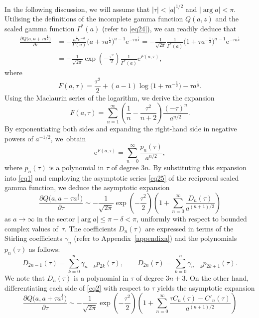 \documentclass[pdftex]{sigma}
\def\e{\mathrm{e}}
\numberwithin{equation}{section}
\begin{document}
In the following discussion, we will assume that $|\tau| < |a|^{1/2}$ and $|\arg a| < \pi$. Utilising the definitions of the incomplete gamma function $Q(a,z)$ and the scaled gamma function $\Gamma^\ast (a)$ (refer to \eqref{eq24}), we can readily deduce that
\begin{align}
\frac{\partial Q\big(a,a + \tau a^{\frac{1}{2}}\big)}{\partial \tau} & = - \frac{a^{\frac{1}{2}} \e^{ - a}}{\Gamma (a)}\big( a + \tau a^{\frac{1}{2}} \big)^{a - 1} \e^{ - \tau a^{\frac{1}{2}} } = - \frac{1}{\sqrt{2\pi }}\frac{1}{\Gamma^\ast (a)}\big( 1 + \tau a^{ - \frac{1}{2}}\big)^{a - 1} \e^{ - \tau a^{\frac{1}{2}} }\nonumber \\ & = - \frac{1}{\sqrt {2\pi }}\exp\left( - \frac{\tau^2}{2} \right)\frac{1}{\Gamma^\ast (a)}\e^{F(a,\tau )} ,\label{eq1}
\end{align}
where
\[
F(a,\tau ) = \frac{\tau ^2}{2} + (a - 1)\log \big(1 + \tau a^{-\frac{1}{2}}\big) - \tau a^{\frac{1}{2}} .
\]
Using the Maclaurin series of the logarithm, we derive the expansion
\[
F(a,\tau ) = \sum_{n = 1}^\infty \left( \frac{1}{n}-\frac{\tau^2}{n + 2}\right)\frac{( - \tau )^n}{a^{n/2}} .
\]
By exponentiating both sides and expanding the right-hand side in negative powers of $a^{-1/2}$, we~obtain
\[
\e^{F(a,\tau )} = \sum_{n = 0}^\infty \frac{p_n (\tau )}{a^{n/2} },
\]
where $p_n(\tau)$ is a polynomial in $\tau$ of degree $3n$. By substituting this expansion into \eqref{eq1} and employing the asymptotic series \eqref{eq25} of the reciprocal scaled gamma function, we deduce the asymptotic expansion
\[
\frac{\partial Q\big(a,a + \tau a^{\frac{1}{2}}\big)}{\partial \tau} \sim - \frac{1}{\sqrt{2\pi}}\exp \left(- \frac{\tau^2}{2}\right)\left( 1 + \sum_{n = 0}^\infty \frac{D_n (\tau )}{a^{(n + 1)/2}} \right)
\]
as $a\to \infty$ in the sector $|\arg a| \le \pi-\delta<\pi$, uniformly with respect to bounded complex values of~$\tau$. The coefficients $D_n(\tau)$ are expressed in terms of the Stirling coefficients $\gamma_n$ (refer to Appendix~\ref{appendixa}) and the polynomials $p_n(\tau)$ as follows:
\begin{equation}\label{eq4}
D_{2n - 1} (\tau ) = \sum_{k = 0}^n \gamma _{n - k} p_{2k} (\tau ) ,\qquad D_{2n} (\tau ) = \sum_{k = 0}^n \gamma _{n - k} p_{2k + 1} (\tau ).
\end{equation}
We note that $D_n(\tau)$ is a polynomial in $\tau$ of degree $3n+3$. On the other hand, differentiating each side of \eqref{eq2} with respect to $\tau$ yields the asymptotic expansion
\[
\frac{\partial Q\big(a,a + \tau a^{\frac{1}{2}}\big)}{\partial \tau} \sim - \frac{1}{\sqrt {2\pi }}\exp \left( - \frac{\tau^2}{2}\right)\left( 1 + \sum_{n = 0}^\infty \frac{\tau C_n (\tau ) - C'_n (\tau )}{a^{(n + 1)/2}} \right)
\]
\end{document}
